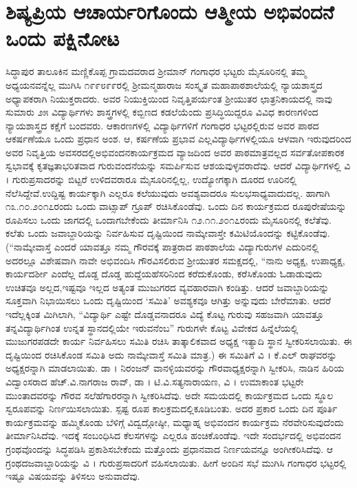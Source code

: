{\fontsize{14}{16}\selectfont

\chapter{ಶಿಷ್ಯಪ್ರಿಯ ಆಚಾರ್ಯರಿಗೊಂದು ಆತ್ಮೀಯ ಅಭಿವಂದನೆ \eng{--} ಒಂದು ಪಕ್ಷಿನೋಟ}

ಸಿದ್ಧಾಪುರ ತಾಲೂಕಿನ ಮಣ್ಣಿಕೊಪ್ಪ ಗ್ರಾಮದವರಾದ ಶ್ರೀಮಾನ್ ಗಂಗಾಧರ ಭಟ್ಟರು ಮೈಸೂರಿನಲ್ಲಿ ತಮ್ಮ ಅಧ್ಯಯನವನ್ನೆಲ್ಲ ಮುಗಿಸಿ ೧೯೯೮\enginline{-}೯೯ರಲ್ಲಿ ಶ್ರೀಮನ್ಮಹಾರಾಜ ಸಂಸ್ಕೃತ ಮಹಾಪಾಠಶಾಲೆಯಲ್ಲಿ ನ್ಯಾಯಶಾಸ್ತ್ರದ ಅಧ್ಯಾಪಕರಾಗಿ \hbox{ನಿಯುಕ್ತರಾದರು}. ಅವರ ನಿಯುಕ್ತಿಯಿಂದ ನಿವೃತ್ತಿಪರ್ಯಂತ ಶ್ರೀಯುತರ ಛಾತ್ರನಿಕಾಯದಲ್ಲಿ ನಾವು ಸುಮಾರು ೨೫ ವಿದ್ಯಾರ್ಥಿಗಳು \enginline{-} ಶಾಸ್ತ್ರಗಳಲ್ಲಿ ಕಬ್ಬಿಣದ ಕಡಲೆಯೆಂದು ಪ್ರಸಿದ್ಧಿ\-ಯಿದ್ದರೂ ವಿವಿಧ ಕಾರಣಗಳಿಂದ ನ್ಯಾಯಶಾಸ್ತ್ರದ ಕಕ್ಷೆಗೆ ಬಂದವರು. ಆ\break ಕಾರಣಗಳಲ್ಲಿ ವಿದ್ಯಾರ್ಥಿಗಳಿಗೆ ಗಂಗಾಧರ ಭಟ್ಟರಲ್ಲಿರುವ ಅವರ ಪಾಠದ ಆಕರ್ಷಣೆಯೂ ಒಂದು ಪ್ರಧಾನ ಅಂಶ. ಆ, ಕರ್ಷಣೆಯ ಪ್ರಭಾವ ಎಲ್ಲ\break ವಿದ್ಯಾರ್ಥಿಗಳಲ್ಲಿಯೂ ಆಳವಾಗಿ ಇರುವುದರಿಂದ ಅವರ ನಿವೃತ್ತಿಯ ಅವಸರದಲ್ಲಿ\break ಅಭಿವಂದನಕಾರ್ಯಕ್ರಮದ ವ್ಯಾಜದಿಂದ ಅವರ ಪಾಠಮಾತ್ರವಲ್ಲದ ಸರ್ವತೋಪ\-ಕಾರಕ ಸ್ವಭಾವಕ್ಕೆ ಕೃತಜ್ಞತಾಭರಿತವಾದ ಗುರುವಂದನೆಯನ್ನು ಸಮರ್ಪಿಸುವ ಆಶಯ\-ವುಳ್ಳವರಾದೆವು. ಆದರೆ ವಿದ್ಯಾರ್ಥಿಗಳಲ್ಲಿ ವಿ । ಗುರುಪ್ರಸಾದರನ್ನು ಬಿಟ್ಟರೆ ಉಳಿದವ\-ರಾರೂ ಮೈಸೂರಿನಲ್ಲಿಲ್ಲ, ಉದ್ಯೋಗಕ್ಕಾಗಿ ದೂರದ ಊರಿನಲ್ಲಿ ನೆಲೆಸಿದ್ದೇವೆ.\break ಉದ್ದಿಷ್ಟ ಕಾರ್ಯಕ್ಕಾಗಿ ಎಲ್ಲರೂ ಕಲೆಯುವುದು ಅವಶ್ಯವಾದರೂ ಸುಲಭಸಾಧ್ಯ\-ವಾದುದಲ್ಲ. ಹಾಗಾಗಿ ೧೩.೧೦.೨೦೧೭ರಂದು ಒಂದು ವಾಟ್ಸಾಪ್ ಗ್ರೂಪ್ ರಚಿಸಿ\-ಕೊಂಡೆವು. ಒಂದು ದಿನ ಕಾರ್ಯಕ್ರಮದ  ರೂಪುರೇಷೆಯನ್ನು ರೂಪಿಸಲು ಒಂದು ಜಾಗದಲ್ಲಿ ಒಂದಾಗಬೇಕೆಂದು ತೀರ್ಮಾನಿಸಿ ೧೨.೧೧.೨೦೧೭ರಂದು ಮೈಸೂರಿನಲ್ಲಿ ಕಲೆತೆವು. ಕಲೆತು ಒಂದು ಜವಾಬ್ದಾರಿಯನ್ನು ನಿರ್ವಹಿಸುವ ದೃಷ್ಟಿಯಿಂದ ನಾಮ್ಕೇವಾಸ್ತೇ ಕಮಿಟಿಯೊಂದನ್ನು ಕಟ್ಟಿಕೊಂಡೆವು. (“ನಾಮ್ಕೇವಾಸ್ತೆ ಎಂದರೆ \enginline{-} ಯಾವತ್ತೂ ನಮ್ಮ ಗೌರವಕ್ಕೆ ಪಾತ್ರರಾದ ಪಾಠಶಾಲೆಯ ವಿದ್ಯಾಗುರುಗಳ ಎದುರಿನಲ್ಲಿ ಅದರಲ್ಲೂ ವಿಶೇಷವಾಗಿ ನಾವೇ ಅಭಿವಂದಿಸಿ ಗೌರವಿಸಲಿರುವ ಶ್ರೀಯುತರ ಸಮಕ್ಷದಲ್ಲಿ, “ನಾನು \enginline{-} ಅಧ್ಯಕ್ಷ, ಉಪಾಧ್ಯಕ್ಷ, ಕಾರ್ಯದರ್ಶೀ ಎಂದೆಲ್ಲ ದೊಡ್ದ ದೊಡ್ಡ ಹುದ್ದೆಯ\break ಹೆಸರಿನಿಂದ ಕರೆದುಕೊಂಡು, ಕರೆಸಿಕೊಂಡು ಓಡಾಡುವುದು ಉಚಿತವೂ ಅಲ್ಲದ,\break ಇಷ್ಟವೂ ಇಲ್ಲದ ಅತ್ಯಂತ ಮುಜುಗರದ ವ್ಯವಹಾರವಾಗಿ ಕಂಡಿತ್ತು. ಆದರೆ ಜವಾಬ್ದಾರಿ\-ಯನ್ನು ಸೂಕ್ತ\-ವಾಗಿ ನಿಭಾಯಿಸಲು ಒಂದು ದೃಷ್ಟಿಯಿಂದ ‘ಸಮಿತಿ’ ಅವಶ್ಯಕವೂ ಆಗಿತ್ತು ಅನ್ನುವುದು ಬೇರೆಮಾತು. ಆದರೆ ಇದೆಲ್ಲಕ್ಕಿಂತ ಮಿಗಿಲಾಗಿ, “ವಿದ್ಯಾರ್ಥಿ ಎಷ್ಟೇ ದೊಡ್ಡವನಾದರೂ ವಿದ್ಯೆ ಕೊಟ್ಟ ಗುರುವು ಸಹಜವಾಗಿ ಯಾವತ್ತೂ ತನ್ನ\break ವಿದ್ಯಾರ್ಥಿಗಿಂತ ಉನ್ನತ ಸ್ಥಾನದಲ್ಲಿಯೇ ಇರುವನೆಂಬ” ಗುರುಗಳೇ ಕೊಟ್ಟ \hbox{ವಿವೇಕದ} ಹಿನ್ನೆಲೆಯಲ್ಲಿ ಮುಜುಗರಪಡದೇ ಕಾರ್ಯ ನಿರ್ವಹಿಸಲು ಸಮಿತಿ ರಚಿಸಿ ತಾತ್ಕಾಲಿಕ\-ವಾದ ಅಧ್ಯಕ್ಷ ಇತ್ಯಾದಿ ಸ್ಥಾನ  ಸ್ವೀಕರಿಸಲಾಯಿತು. ಈ ದೃಷ್ಟಿಯಿಂದ ರಚಿಸಿಕೊಂಡ ಸಮಿತಿ ಅದು ನಾಮ್ಕೇವಾಸ್ತೆ ಸಮಿತಿ ಮಾತ್ರ.) ಈ ಸಮಿತಿಗೆ ವಿ । ಕೆ.ಎಲ್ ರಾಘವ\-ರನ್ನು ಅಧ್ಯಕ್ಷರನ್ನಾಗಿ ಮಾಡಲಾಯಿತು. ಡಾ । ನಿರಂಜನ್ ವಾನಳ್ಳಿಯವರನ್ನು ಗೌರವಾಧ್ಯಕ್ಷರನ್ನಾಗಿ ಸ್ವೀಕರಿಸಿ, ನಾಡಿನ ಹಿರಿಯ ವಿದ್ವಾಂಸರಾದ  ಹೆಚ್.ವಿ.ನಾಗರಾಜ ರಾವ್, ಡಾ । ಟಿ.ವಿ.ಸತ್ಯನಾರಾಯಣ, ವಿ । ಉಮಾಕಾಂತ ಭಟ್ಟರೇ ಮುಂತಾದವ\-ರನ್ನು ಗೌರವ ಸಲೆಹೆಗಾರರನ್ನಾಗಿ ಸ್ವೀಕರಿಸಿದೆವು. ಅದೇ ಸಮಯದಲ್ಲಿ ಕಾರ್ಯಕ್ರಮದ ಒಂದು ಸ್ಥೂಲ ಸ್ವರೂಪವನ್ನು ನಿರ್ಣಯಿಸಲಾಯಿತು. ಸ್ಪಷ್ಟ ರೂಪ ಕಾಲಕ್ರಮದಲ್ಲಿ\break ಕೂಡಿಬಂತು. ಅದರ ಪ್ರಕಾರ ಒಂದು ದಿನ ಪೂರ್ತಿ ಕಾರ್ಯಕ್ರಮವನ್ನು ಹಮ್ಮಿಕೊಂಡು ಬೆಳಿಗ್ಗೆ ವಿದ್ವದ್ಗೋಷ್ಠೀ, ಮಧ್ಯಾಹ್ನ ಅಭಿವಂದನ ಕಾರ್ಯಕ್ರಮ ನೆರವೇರಿಸುವು\-ದೆಂದು ತೀರ್ಮಾನಿಸಿದೆವು. ಇದಕ್ಕೆ ಸಂಬಂಧಿಸಿದ ಕೆಲಸಗಳನ್ನು ಎಲ್ಲರೂ ಹಂಚಿಕೊಂಡೆವು. ಇದೇ ಸಂದರ್ಭದಲ್ಲಿ ಅಭಿವಂದನ ಗ್ರಂಥವೊಂದನ್ನು ಸಿದ್ಧಪಡಿಸಿ ಪ್ರಕಾಶಿಸ\-ಬೇಕೆಂದು ಮತ್ತೊಂದು ಪ್ರಧಾನವಾದ ನಿರ್ಣಯವನ್ನೂ ಅಂಗೀಕರಿಸಿದೆವು. ಆ ಗ್ರಂಥದ\break ಜವಾಬ್ದಾರಿಯನ್ನು ವಿ । ಗುರುಪ್ರಸಾದರಿಗೆ ವಹಿಸಲಾಯಿತು. ಹೀಗೆ ಅಂದಿನ ಸಭೆ ಮುಗಿಸಿ ಗಂಗಾಧರ ಭಟ್ಟರಲ್ಲಿ ಇಷ್ಟೂ ವಿಷಯವನ್ನು ತಿಳಿಸಲು ಅನುವಾದೆವು.

}
